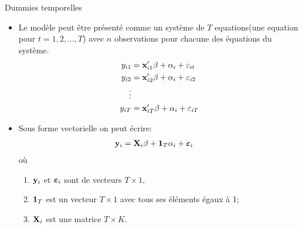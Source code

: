 \begin{frame}[allowframebreaks]{Dummies temporelles}
\begin{itemize}
\framebreak 

\item Le  modèle peut être présenté comme un système de $T$ equations(une equation pour  $t=1, 2, \ldots, T$) 
avec $n$ observations pour chacune des équations du système.
\begin{align*}
y_{i1} &= {\mathbf x}_{i1}^\prime\beta + \alpha_i + \varepsilon_{it}\\
y_{i2} &= {\mathbf x}_{i2}^\prime\beta + \alpha_i + \varepsilon_{i2}\\
 \vdots &\\
 y_{iT} &= {\mathbf x}_{iT}^\prime\beta + \alpha_i + \varepsilon_{iT}    
\end{align*}
\item Sous forme vectorielle on peut écrire:
\begin{align*}
{\mathbf y}_i &= \mathbf X_i\beta + {\mathbf 1}_T\alpha_i +{\boldsymbol \varepsilon}_i\
\end{align*}
où
\begin{enumerate}[$\star$]
\item  ${\mathbf y}_i $ et ${\boldsymbol \varepsilon}_i$   sont de vecteurs $T\times 1$, 
\item ${\mathbf 1}_T$ est un vecteur  $T\times 1$ avec tous ses éléments égaux à 1; 
\item $\mathbf X_i$ est une matrice  $T\times K$. 
\end{enumerate}

\framebreak 


\end{itemize}
\end{frame}
